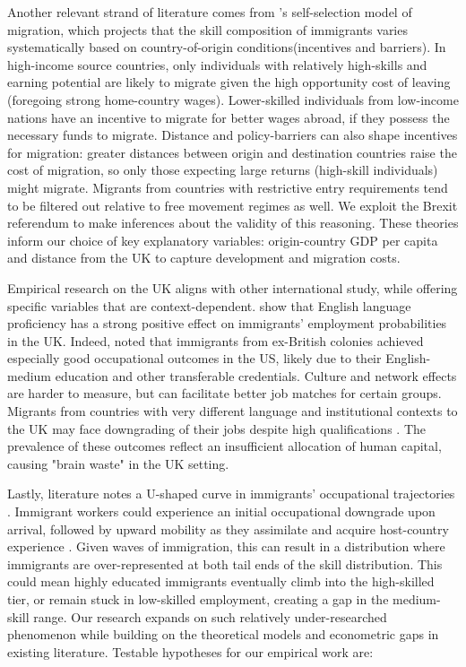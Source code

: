 \documentclass[12pt, a4paper]{article}
\begin{document}
Another relevant strand of literature comes from \citet{BorjasSelfSelection}'s self-selection model of migration, which projects that the skill composition of immigrants varies systematically based on country-of-origin conditions(incentives and barriers). In high-income source countries, only individuals with relatively high-skills and earning potential are likely to migrate given the high opportunity cost of leaving (foregoing strong home-country wages). Lower-skilled individuals from low-income nations have an incentive to migrate for better wages abroad, if they possess the necessary funds to migrate. Distance and policy-barriers can also shape incentives for migration: greater distances between origin and destination countries raise the cost of migration, so only those expecting large returns (high-skill individuals) might migrate. Migrants from countries with restrictive entry requirements tend to be filtered out relative to free movement regimes as well. We exploit the Brexit referendum to make inferences about the validity of this reasoning. These theories inform our choice of key explanatory variables: origin-country GDP per capita and distance from the UK to capture development and migration costs.

Empirical research on the UK aligns with other international study, while offering specific variables that are context-dependent. \citet{DustmannFabbriLanguage} show that English language proficiency has a strong positive effect on immigrants’ employment probabilities in the UK. Indeed, \citet{MattooBrainWaste} noted that immigrants from ex-British colonies achieved especially good occupational outcomes in the US, likely due to their English-medium education and other transferable credentials. Culture and network effects are harder to measure, but can facilitate better job matches for certain groups. Migrants from countries with very different language and institutional contexts to the UK may face downgrading of their jobs despite high qualifications \citep{LindleyUKOverEd}. The prevalence of these outcomes reflect an insufficient allocation of human capital, causing "brain waste" in the UK setting.

Lastly, literature notes a U-shaped curve in immigrants’ occupational trajectories \citep{ZorluUshaped}. Immigrant workers could experience an initial occupational downgrade upon arrival, followed by upward mobility as they assimilate and acquire host-country experience \citep{ChiswickTimeSpent}. Given waves of immigration, this can result in a distribution where immigrants are over-represented at both tail ends of the skill distribution. This could mean highly educated immigrants eventually climb into the high-skilled tier, or remain stuck in low-skilled employment, creating a gap in the medium-skill range. Our research expands on such relatively under-researched phenomenon while building on the theoretical models and econometric gaps in existing literature. Testable hypotheses for our empirical work are: 
\end{document}
